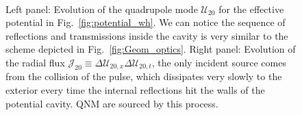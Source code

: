 \documentclass[article,aps,nofootinbib,twocolumn,superscriptaddress]{revtex4-1}
\begin{document}
\begin{figure}
\centering
{} \,
\caption{\label{fig:sol_n_flux_wh} Left panel: Evolution of the quadrupole mode $\mathcal{U}_{20}$ for the effective potential in Fig.~\ref{fig:potential_wh}. We can notice the sequence of reflections and transmissions inside the cavity is very similar to the scheme depicted in Fig.~\ref{fig:Geom_optics}. Right panel: Evolution of the radial flux $\mathcal{J}_{20}\equiv \Delta\mathcal{U}_{20,x} \Delta\mathcal{U}_{20,t}$, the only incident source comes from the collision of the pulse, which dissipates very slowly to the exterior every time the internal reflections hit the walls of the potential cavity. QNM are sourced by this process.} 
\end{figure}
\end{document}
